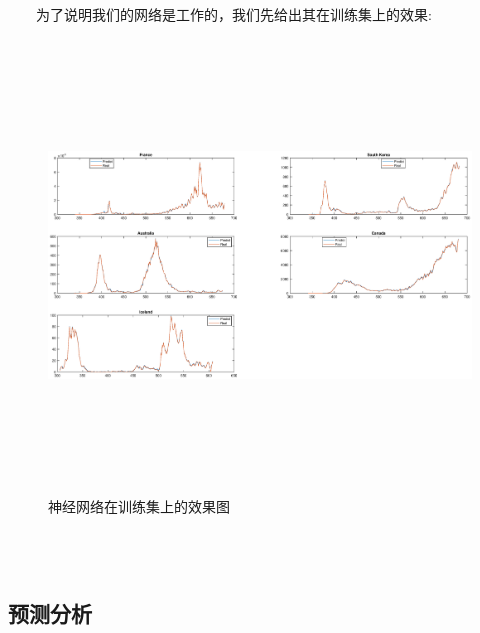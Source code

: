 \documentclass[a4paper, titlepage]{article}
\begin{document}
	　　为了说明我们的网络是工作的，我们先给出其在训练集上的效果:\\
    \vspace{-1em}
    \begin{minipage}{\textwidth}
        \begin{figure}[H]
            \centering
	        \includegraphics[height=12cm, width=14cm]{./Chap4/trainset.eps}
            \vspace{-2em}
            \caption{神经网络在训练集上的效果图}
	    \end{figure}
    \end{minipage}\\\quad\\
    \subsection{预测分析}
\end{document}
